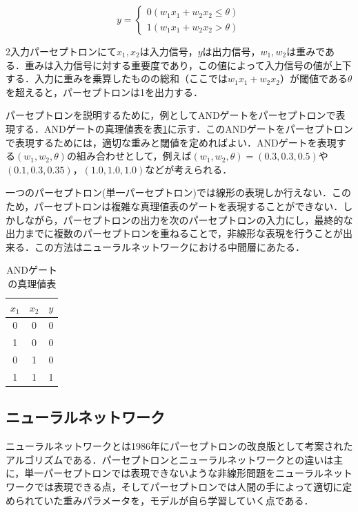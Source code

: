 \documentclass[a4j, 11pt]{jreport}
\begin{document}
\begin{equation}
y= \left \{
\begin{array}{l}
0　(w_1x_1 + w_2x_2 \leq \theta)\\
1　(w_1x_1 + w_2x_2 > \theta)
\end{array}
\right.
\label{eq:pa-septoron}
\end{equation}

2入力パーセプトロンにて$x_1, x_2$は入力信号，$y$は出力信号，$w_1, w_2$は重みである．重みは入力信号に対する重要度であり，この値によって入力信号の値が上下する．入力に重みを乗算したものの総和（ここでは$w_1x_1 + w_2x_2$）が閾値である$\theta$を超えると，パーセプトロンは1を出力する．

パーセプトロンを説明するために，例としてANDゲートをパーセプトロンで表現する．ANDゲートの真理値表を表\ref{tb:and_gate}に示す．このANDゲートをパーセプトロンで表現するためには，適切な重みと閾値を定めればよい．ANDゲートを表現する$(w_1, w_2, \theta)$の組み合わせとして，例えば$(w_1, w_2, \theta) = (0.3, 0.3, 0.5)$や$(0.1, 0.3, 0.35)$，$(1.0, 1.0, 1.0)$などが考えられる．

一つのパーセプトロン(単一パーセプトロン)では線形の表現しか行えない．このため，パーセプトロンは複雑な真理値表のゲートを表現することができない．しかしながら，パーセプトロンの出力を次のパーセプトロンの入力にし，最終的な出力までに複数のパーセプトロンを重ねることで，非線形な表現を行うことが出来る．この方法はニューラルネットワークにおける中間層にあたる．

\begin{table}[H]
  \centering
	\caption{ANDゲートの真理値表}
  \begin{tabular}{cc|c}
    $x_1$ & $x_2$ & $y$ \\ \hline
    0 & 0 & 0 \\ 
    1 & 0 & 0 \\
    0 & 1 & 0 \\
    1 & 1 & 1 \\
  \end{tabular}
  \label{tb:and_gate}
\end{table}


\subsection{ニューラルネットワーク}
ニューラルネットワークとは1986年にパーセプトロンの改良版として考案されたアルゴリズムである．パーセプトロンとニューラルネットワークとの違いは主に，単一パーセプトロンでは表現できないような非線形問題をニューラルネットワークでは表現できる点，そしてパーセプトロンでは人間の手によって適切に定められていた重みパラメータを，モデルが自ら学習していく点である．
\end{document}
